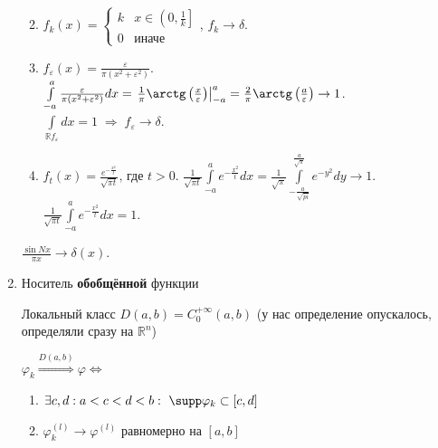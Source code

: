\begin{enumerate}
\begin{example}
  \begin{enumerate}
  \def\labelenumii{\arabic{enumii}.}
  \item
    \(f_{k}  (x)  =  \begin{cases}k  & x  \in   \left(0,  \frac{1}{k}\right]\\  0  &  \text{иначе}\end{cases}\),
    \(f_{k}  \rightarrow  \delta \).
  \item
    \(f_{\varepsilon }  (x)  =  \frac{\varepsilon }{\pi   (x^2  + \varepsilon ^2)}\).
    \(\int \limits_{-  a}^{a}  \frac{\varepsilon }{\pi   (x^2  + \varepsilon ^2)} d x  =  \left.\frac{1}{\pi }  \arctg  \left(\frac{x}{\varepsilon }\right)\right|_{-  a}^{a}  =  \frac{2}{\pi }  \arctg  \left(\frac{a}{\varepsilon }\right)  \rightarrow   1\).
    \(\int \limits_{\mathbb{R}  f_{\varepsilon }} d x  =  1  \;  \Rightarrow   \; f_{\varepsilon }  \rightarrow  \delta \).
  \item
    \(f_{t}  (x)  =  \frac{e^{-   \frac{x^2}{t}}}{\sqrt {\pi  t}}  \text{, где  } t  >  0\).
    \(\frac{1}{\sqrt {\pi  t}}  \int \limits_{-  a}^{a} e^{-   \frac{x^2}{t}} d x  =  \frac{1}{\sqrt {\pi }}  \int \limits_{-   \frac{a}{\sqrt {pi}}}^{\frac{a}{\sqrt {\pi }}} e^{-  y^2} d y  \rightarrow   1\).
    \(\frac{1}{\sqrt {\pi  t}}  \int \limits_{-  a}^{a} e^{-   \frac{x^2}{t}} d x  =  1\).
  \end{enumerate}

  \end{example}

  \begin{exercise}

  \(\frac{\sin N x}{\pi  x}  \rightarrow  \delta   (x)\).

  \end{exercise}
\item
  Носитель \textbf{обобщённой} функции

  Локальный класс \(D(a, b)  = C_0^{+  \infty }  (a, b)\) (у нас
  определение опускалось, определяли сразу на \(\mathbb{R} ^n\))

  \begin{definition}

  \(\varphi _k  \overset{D(a, b)}{\Longrightarrow} \varphi   \Leftrightarrow \)

  \begin{enumerate}
  \def\labelenumii{\arabic{enumii}.}
  \item
    \(\exists  c, d: a  < c  < d  < b:  \  \supp \varphi _k  \subset   [c, d]\)
  \item
    \(\varphi _k^{(l)}  \to \varphi ^{(l)}\) равномерно на \([a, b]\)
  \end{enumerate}


\end{definition}
\end{enumerate}
